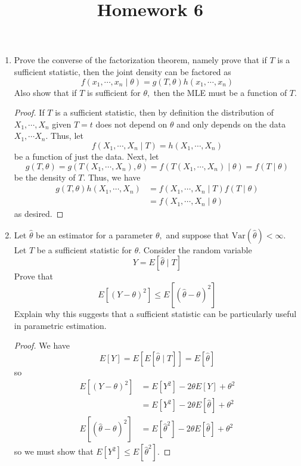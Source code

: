 \documentclass{article}
\newcommand{\var}{\mathrm{Var}}
\begin{document}
\title{Homework 6}
\maketitle
\thispagestyle{fancy}

\begin{enumerate}
	\item Prove the converse of the factorization theorem, namely prove that if $T$ is a sufficient statistic, then the joint density can be factored as \[f(x_1, \cdots, x_n\mid\theta)=g(T, \theta)h(x_1, \cdots, x_n)\] Also show that if $T$ is sufficient for $\theta,$ then the MLE must be a function of $T.$
		\begin{proof}
			If $T$ is a sufficient statistic, then by definition the distribution of $X_1, \cdots, X_n$ given $T=t$ does not depend on $\theta$ and only depends on the data $X_1,\cdots X_n.$ Thus, let \[f(X_1, \cdots, X_n\mid T) = h(X_1, \cdots, X_n)\] be a function of just the data. Next, let \[g(T, \theta) = g(T(X_1, \cdots, X_n), \theta) = f(T(X_1, \cdots, X_n)\mid \theta)=f(T\mid \theta)\] be the density of $T.$ Thus, we have
			\begin{align*}
				g(T, \theta) h(X_1, \cdots, X_n) &= f(X_1, \cdots, X_n\mid T) f(T\mid \theta) \\
				&= f(X_1, \cdots, X_n\mid \theta)
			\end{align*} as desired.

		\end{proof}

	\item Let $\hat{\theta}$ be an estimator for a parameter $\theta,$ and suppose that $\var(\hat{\theta})<\infty.$ Let $T$ be a sufficient statistic for $\theta.$ Consider the random variable \[Y=E[\hat{\theta}\mid T]\] Prove that \[E\left[ \left( Y-\theta \right)^2 \right]\le E\left[ \left( \hat{\theta}-\theta \right)^2 \right]\] Explain why this suggests that a sufficient statistic can be particularly useful in parametric estimation.
		\begin{proof}
			We have \[E[Y]=E\left[ E[\hat{\theta}\mid T] \right] = E[\hat{\theta}]\] so
			\begin{align*}
				E\left[ (Y-\theta)^2 \right] &= E[Y^2]-2\theta E[Y] + \theta^2 \\
				&= E[Y^2] - 2\theta E[\hat{\theta}]+\theta^2 \\
				E\left[ \left( \hat{\theta}-\theta \right)^2 \right] &= E[\hat{\theta}^2] - 2\theta E[\hat{\theta}] + \theta^2
			\end{align*}
			so we must show that $E[Y^2] \le E[\hat{\theta}^2].$


\end{proof}
\end{enumerate}
\end{document}

